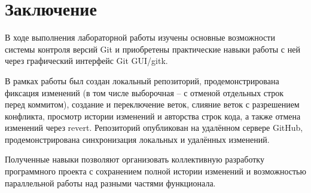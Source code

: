 \section{Заключение}

В ходе выполнения лабораторной работы изучены основные возможности
системы контроля версий Git и приобретены практические навыки работы с ней
через графический интерфейс Git GUI/gitk. 

В рамках работы был создан локальный репозиторий, продемонстрирована
фиксация изменений (в том числе выборочная – с отменой отдельных строк
перед коммитом), создание и переключение веток, слияние веток с разрешением
конфликта, просмотр истории изменений и авторства строк кода, а также отмена
изменений через revert. Репозиторий опубликован на удалённом сервере GitHub,
продемонстрирована синхронизация локальных и удалённых изменений.

Полученные навыки позволяют организовать коллективную разработку
программного проекта с сохранением полной истории изменений и
возможностью параллельной работы над разными частями функционала.
